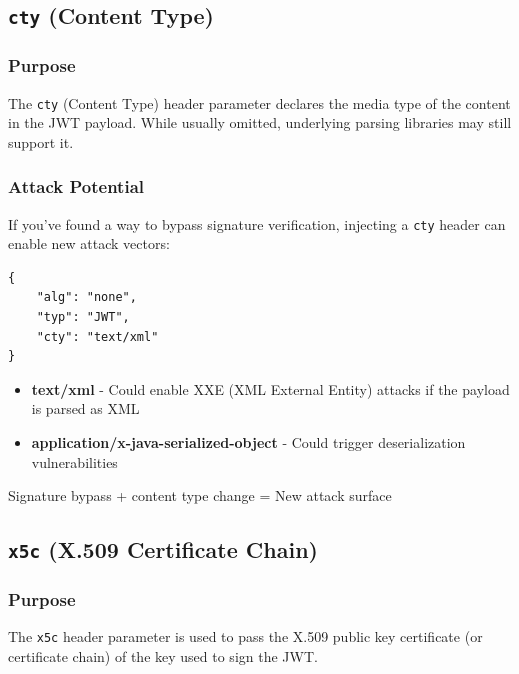 \documentclass{article}
\begin{document}
\subsection{\texttt{cty} (Content Type)}

\subsubsection{Purpose}

The \texttt{cty} (Content Type) header parameter declares the media type of the content in the JWT payload. While usually omitted, underlying parsing libraries may still support it.

\subsubsection{Attack Potential}

If you've found a way to bypass signature verification, injecting a \texttt{cty} header can enable new attack vectors:

\begin{lstlisting}[caption=Injecting cty Header]
{
    "alg": "none",
    "typ": "JWT",
    "cty": "text/xml"
}
\end{lstlisting}

\begin{itemize}
    \item \textbf{text/xml} - Could enable XXE (XML External Entity) attacks if the payload is parsed as XML
    \item \textbf{application/x-java-serialized-object} - Could trigger deserialization vulnerabilities
\end{itemize}

\begin{attackbox}
Signature bypass + content type change = New attack surface
\end{attackbox}

\subsection{\texttt{x5c} (X.509 Certificate Chain)}

\subsubsection{Purpose}

The \texttt{x5c} header parameter is used to pass the X.509 public key certificate (or certificate chain) of the key used to sign the JWT.
\end{document}
